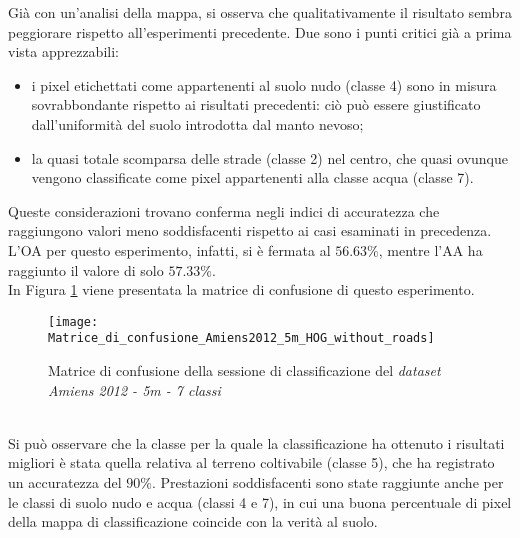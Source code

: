 Già con un'analisi della mappa, si osserva che qualitativamente il risultato sembra peggiorare rispetto all'esperimenti precedente. Due sono i punti critici già a prima vista apprezzabili:
\begin{itemize}
\item i pixel etichettati come appartenenti al suolo nudo (classe 4) sono in misura sovrabbondante rispetto ai risultati precedenti: ciò può essere giustificato dall'uniformità del suolo introdotta dal manto nevoso;
\item la quasi totale scomparsa delle strade (classe 2) nel centro, che quasi ovunque vengono classificate come pixel appartenenti alla classe acqua (classe 7).
\end{itemize}

Queste considerazioni trovano conferma  negli indici di accuratezza  che raggiungono valori meno soddisfacenti rispetto ai casi esaminati in precedenza.
L'OA per questo esperimento, infatti, si è fermata al $56.63\%$, mentre l'AA ha raggiunto il valore di  solo $57.33\%$.\\
 In Figura \ref{fig:Matrice_di_confusione_Amiens2012_5m_HOG_without_roads} viene presentata la matrice di confusione di questo esperimento.
\\
\begin{figure}[!ht]
\texttt{[image: Matrice\_di\_confusione\_Amiens2012\_5m\_HOG\_without\_roads]}
\caption{Matrice di confusione della sessione di classificazione del \emph{dataset} \emph{Amiens 2012 - 5m - 7 classi}}
\label{fig:Matrice_di_confusione_Amiens2012_5m_HOG_without_roads}
\end{figure}
\
\\
Si può osservare che la classe per la quale la classificazione ha ottenuto i risultati migliori è stata quella relativa al terreno coltivabile (classe 5), che ha registrato un accuratezza del $90\%$. Prestazioni soddisfacenti sono state raggiunte anche per le classi di suolo nudo e acqua (classi 4 e 7), in cui una buona percentuale di pixel della mappa di classificazione coincide con la verità al suolo.\\

%      


